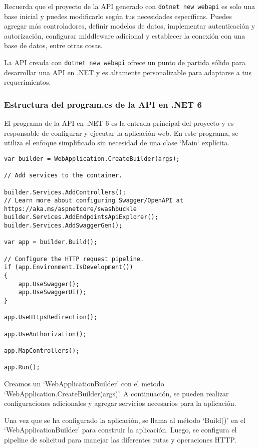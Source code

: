 \documentclass[executivepaper]{article}
\begin{document}
Recuerda que el proyecto de la API generado con \texttt{dotnet new webapi} es solo una base inicial y puedes modificarlo según tus necesidades específicas. Puedes agregar más controladores, definir modelos de datos, implementar autenticación y autorización, configurar middleware adicional y establecer la conexión con una base de datos, entre otras cosas.

La API creada con \texttt{dotnet new webapi} ofrece un punto de partida sólido para desarrollar una API en .NET y es altamente personalizable para adaptarse a tus requerimientos.

\subsubsection*{Estructura del program.cs de la API en .NET 6}

El programa de la API en .NET 6 es la entrada principal del proyecto y es responsable de configurar y ejecutar la aplicación web. En este programa, se utiliza el enfoque simplificado sin necesidad de una clase `Main` explícita.

\begin{lstlisting}[language={[Sharp]C}]
var builder = WebApplication.CreateBuilder(args);

// Add services to the container.

builder.Services.AddControllers();
// Learn more about configuring Swagger/OpenAPI at https://aka.ms/aspnetcore/swashbuckle
builder.Services.AddEndpointsApiExplorer();
builder.Services.AddSwaggerGen();

var app = builder.Build();

// Configure the HTTP request pipeline.
if (app.Environment.IsDevelopment())
{
    app.UseSwagger();
    app.UseSwaggerUI();
}

app.UseHttpsRedirection();

app.UseAuthorization();

app.MapControllers();

app.Run();    
\end{lstlisting}

Creamos un \enquote*{WebApplicationBuilder} con el metodo \enquote*{WebApplication.CreateBuilder(args)}. A continuación, se pueden realizar configuraciones adicionales y agregar servicios necesarios para la aplicación.

Una vez que se ha configurado la aplicación, se llama al método \enquote*{Build()} en el \enquote*{WebApplicationBuilder} para construir la aplicación. Luego, se configura el pipeline de solicitud para manejar las diferentes rutas y operaciones HTTP.
\end{document}
